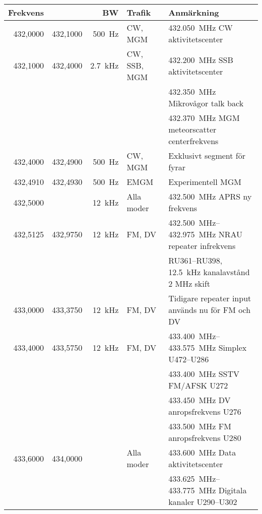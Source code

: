\begin{tabular}{rrrll}
	\textbf{Frekvens} &          & \textbf{BW} & \textbf{Trafik} & \textbf{Anmärkning}   \\ \hline

432,0000 & 432,1000 & \qty{500}{\hertz}  & CW, MGM      & \qty{432,050}{\mega\hertz} CW aktivitetscenter \\ \hline
432,1000 & 432,4000 & \qty{2,7}{\kilo\hertz}  & CW, SSB, MGM  & \qty{432,200}{\mega\hertz} SSB aktivitetscenter  \\
         &          &         &              & \qty{432,350}{\mega\hertz} Mikrovågor talk back \\ \hline
         &          &         &              & \qty{432,370}{\mega\hertz} MGM meteorscatter centerfrekvens\\ \hline
432,4000 & 432,4900 & \qty{500}{\hertz} & CW, MGM      & Exklusivt segment för fyrar                        \\ \hline
432,4910 & 432,4930 & \qty{500}{\hertz} & EMGM      & Experimentell MGM                                 \\ \hline
432,5000 &          & \qty{12}{\kilo\hertz} & Alla moder   & \qty{432,500}{\mega\hertz} APRS ny frekvens \\ \hline
432,5125 & 432,9750 & \qty{12}{\kilo\hertz} & FM, DV   & \SIrange{432,500}{432,975}{\mega\hertz} NRAU repeater infrekvens \\
         &           &         &              & RU361--RU398, \qty{12,5}{\kilo\hertz} kanalavstånd  2 MHz skift \\ \hline
433,0000 & 433,3750 & \qty{12}{\kilo\hertz} & FM, DV     & Tidigare repeater input används nu för FM och DV \\ \hline
433,4000 & 433,5750 & \qty{12}{\kilo\hertz} & FM, DV     & \SIrange{433,400}{433,575}{\mega\hertz} Simplex U472--U286 \\
         &          &         &              & \qty{433,400}{\mega\hertz} SSTV FM/AFSK U272 \\
         &          &         &              & \qty{433,450}{\mega\hertz} DV anropsfrekvens U276 \\
         &          &         &              & \qty{433,500}{\mega\hertz} FM anropsfrekvens U280 \\ \hline
433,6000 & 434,0000 &         & Alla moder   & \qty{433,600}{\mega\hertz} Data aktivitetscenter \\
         &          &         &              & \SIrange{433,625}{433,775}{\mega\hertz} Digitala kanaler U290--U302 \\

\end{tabular}
